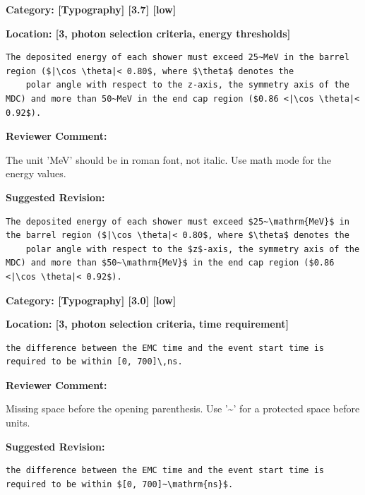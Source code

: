 \documentclass[12pt]{article}
\begin{document}
\begin{reviewer}
\noindent \textbf{Category: [Typography] [3.7] [low]}

\noindent \textbf{Location: [3, photon selection criteria, energy thresholds]}

\begin{lstlisting}[breaklines=true]
	The deposited energy of each shower must exceed 25~MeV in the barrel region ($|\cos \theta|< 0.80$, where $\theta$ denotes the
	polar angle with respect to the z-axis, the symmetry axis of the MDC) and more than 50~MeV in the end cap region ($0.86 <|\cos \theta|< 0.92$).
\end{lstlisting}

\textbf{Reviewer Comment:}

The unit 'MeV' should be in roman font, not italic. Use math mode for the energy values.

\textbf{Suggested Revision:}

\begin{lstlisting}[breaklines=true]
	The deposited energy of each shower must exceed $25~\mathrm{MeV}$ in the barrel region ($|\cos \theta|< 0.80$, where $\theta$ denotes the
	polar angle with respect to the $z$-axis, the symmetry axis of the MDC) and more than $50~\mathrm{MeV}$ in the end cap region ($0.86 <|\cos \theta|< 0.92$).
\end{lstlisting}

\end{reviewer}

\begin{reviewer}
\noindent \textbf{Category: [Typography] [3.0] [low]}

\noindent \textbf{Location: [3, photon selection criteria, time requirement]}

\begin{lstlisting}[breaklines=true]
	the difference between the EMC time and the event start time is required to be within [0, 700]\,ns.
\end{lstlisting}

\textbf{Reviewer Comment:}

Missing space before the opening parenthesis. Use '\textasciitilde{}' for a protected space before units.

\textbf{Suggested Revision:}

\begin{lstlisting}[breaklines=true]
	the difference between the EMC time and the event start time is required to be within $[0, 700]~\mathrm{ns}$.
\end{lstlisting}

\end{reviewer}
\end{document}

